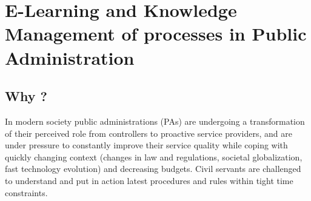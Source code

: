 \documentclass{learnpad}
\begin{document}
\tableofcontents




\mainmatter


\chapter{E-Learning and Knowledge Management of processes in Public Administration}
\label{ch:intro}

\section{Why \learnpad?}
In modern society public administrations (PAs) are undergoing a transformation
of their perceived role from controllers to proactive service providers, and are
under pressure to constantly improve their service quality while coping with
quickly changing context (changes in law and regulations, societal
globalization, fast technology evolution) and decreasing budgets.  Civil
servants are challenged to understand and put in action latest procedures and
rules within tight time constraints.
\end{document}

